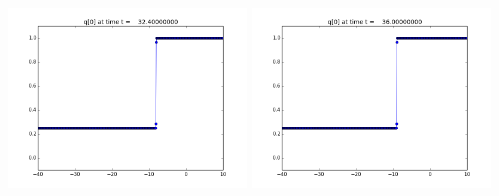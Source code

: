 \documentclass[11pt]{article}
\begin{document}
\vskip 10pt 
\includegraphics[width=0.475\textwidth]{frame0009fig1.png}
\vskip 10pt 
\includegraphics[width=0.475\textwidth]{frame0010fig1.png}
\end{document}
